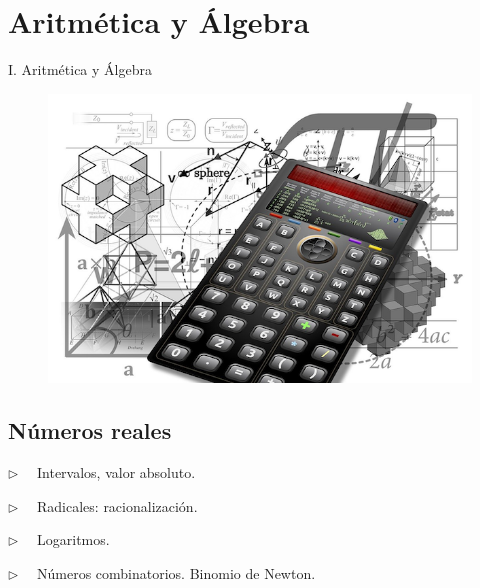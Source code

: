 \part{Aritmética y Álgebra}


\null\vfill
\begin{Huge}\begin{center}
I. Aritmética y Álgebra
\end{center}\end{Huge}

\vspace{1.5cm}


\begin{figure}[H]
	\centering
	\includegraphics[width=.9\textwidth]{imagenes/part1.png}	
\end{figure}
\par
\vfill

\chapter{Números reales}


\vspace{15mm}


\begin{adjustwidth}{40pt}{40pt}
\begin{cuadro-gris}

	\begin{multicols}{2}
	$\triangleright \quad$  Intervalos, valor absoluto.
	
	$\triangleright \quad$  Radicales: racionalización.
	
	$\triangleright \quad$  Logaritmos.
	
	$\triangleright \quad$  Números combinatorios. Binomio de Newton.
	\end{multicols}
	
\end{cuadro-gris}
\end{adjustwidth}


